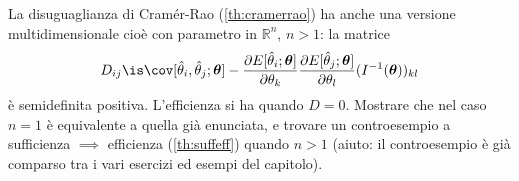 \begin{exercise} \label{ex:cramerraond}
    La disuguaglianza di Cramér-Rao (\autoref{th:cramerrao}) ha anche una
    versione multidimensionale cioè con parametro in $\mathbb R^n$, $n > 1$:
    la matrice
    \begin{equation*}
        D_{ij} \is
        \cov[\hat\theta_i, \hat\theta_j;\boldsymbol\theta] -
        \frac{\partial E[\hat\theta_i;\boldsymbol\theta]}{\partial\theta_k}
        \frac{\partial E[\hat\theta_j;\boldsymbol\theta]}{\partial\theta_l}
        (I^{-1}(\boldsymbol\theta))_{kl}
    \end{equation*}
    è semidefinita positiva. L'efficienza si ha quando $D = 0$. Mostrare che
    nel caso $n = 1$ è equivalente a quella già enunciata, e trovare un
    controesempio a sufficienza $\implies$ efficienza (\autoref{th:suffeff})
    quando $n > 1$ (aiuto: il controesempio è già comparso tra i vari esercizi
    ed esempi del capitolo).
\end{exercise}

